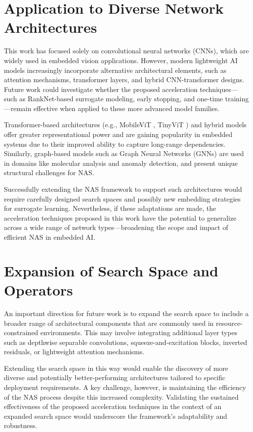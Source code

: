 \section{Application to Diverse Network Architectures}

This work has focused solely on convolutional neural networks (CNNs), which are widely used in embedded vision applications. However, modern lightweight AI models increasingly incorporate alternative architectural elements, such as attention mechanisms, transformer layers, and hybrid CNN-transformer designs. Future work could investigate whether the proposed acceleration techniques—such as RankNet-based surrogate modeling, early stopping, and one-time training—remain effective when applied to these more advanced model families.

Transformer-based architectures (e.g., MobileViT \cite{MobileViT}, TinyViT \cite{TinyViT}) and hybrid models offer greater representational power and are gaining popularity in embedded systems due to their improved ability to capture long-range dependencies. Similarly, graph-based models such as Graph Neural Networks (GNNs) are used in domains like molecular analysis and anomaly detection, and present unique structural challenges for NAS.

Successfully extending the NAS framework to support such architectures would require carefully designed search spaces and possibly new embedding strategies for surrogate learning. Nevertheless, if these adaptations are made, the acceleration techniques proposed in this work have the potential to generalize across a wide range of network types—broadening the scope and impact of efficient NAS in embedded AI.


\section{Expansion of Search Space and Operators}

An important direction for future work is to expand the search space to include a broader range of architectural components that are commonly used in resource-constrained environments. This may involve integrating additional layer types such as depthwise separable convolutions, squeeze-and-excitation blocks, inverted residuals, or lightweight attention mechanisms.

Extending the search space in this way would enable the discovery of more diverse and potentially better-performing architectures tailored to specific deployment requirements. A key challenge, however, is maintaining the efficiency of the NAS process despite this increased complexity. Validating the sustained effectiveness of the proposed acceleration techniques in the context of an expanded search space would underscore the framework’s adaptability and robustness.

